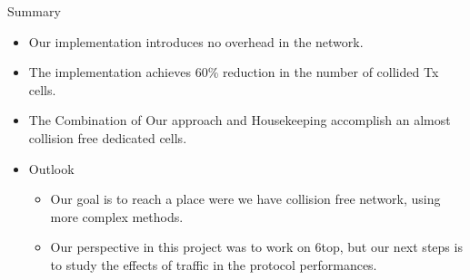 \begin{withoutheadline}
\begin{frame}{Summary}
  \begin{itemize}
  \item
    Our implementation introduces  \alert{no overhead } in the network.
  \item
    The implementation \alert{achieves 60\% reduction} in the number of collided Tx cells.
  \item The Combination of Our approach and Housekeeping accomplish an \alert{ almost collision free dedicated cells}.
  \end{itemize}
  
  \begin{itemize}
  \item
    Outlook
    \begin{itemize}
    \item
     Our goal is to reach a place were we have collision free network, using more complex methods.
    \item
      Our perspective in this project was to work on 6top, but our next steps is to study the effects of traffic in the protocol performances.
    \end{itemize}
  \end{itemize}
\end{frame}
\end{withoutheadline}


%
